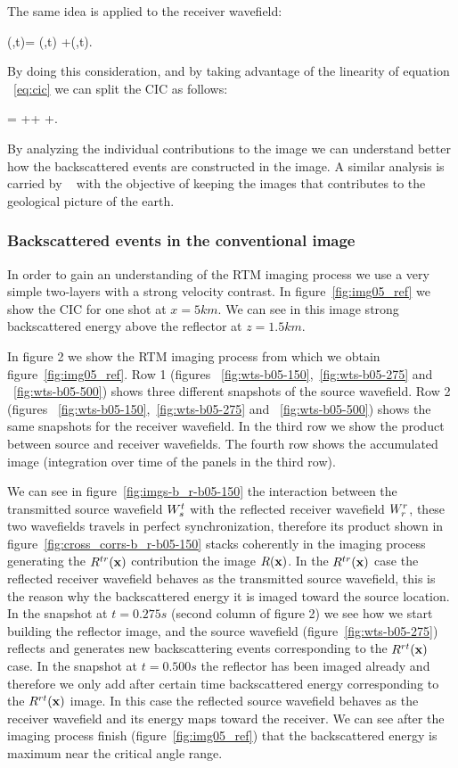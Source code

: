 The same idea is applied to the receiver wavefield:

\beq
\UR(\xx,t)= \URr(\xx,t) +\URt(\xx,t).
\label{eq:rsplit}
\eeq

By doing this consideration, and by taking advantage of the linearity of equation ~\ref{eq:cic}  we
can split the CIC as follows:

\beq
\R= ++  +.
\label{eq:cicsplit}
\eeq

By analyzing the individual contributions to the image we can understand better how the backscattered events
are constructed in the image. A similar analysis is carried by ~\citep{fei:3130,liu:S29} with the objective
of keeping the images that contributes to the geological picture of the earth.

\subsubsection{Backscattered events in the conventional image}

In order to gain an understanding of the RTM imaging process we use a very simple two-layers with a strong velocity
contrast. In figure~\ref{fig:img05_ref} we show the CIC for one shot at $x=5km$. We can see in this image strong 
backscattered energy above the reflector at $z=1.5km$.

In figure 2 we show the RTM imaging process from which we obtain figure~\ref{fig:img05_ref}. Row 1 
(figures ~\ref{fig:wts-b05-150},~\ref{fig:wts-b05-275} and ~\ref{fig:wts-b05-500}) shows three different snapshots
of the source wavefield. Row 2 (figures ~\ref{fig:wts-b05-150},~\ref{fig:wts-b05-275} and ~\ref{fig:wts-b05-500}) 
shows the same snapshots for the receiver wavefield. In the third row we show the product between
source and receiver wavefields. The fourth row shows the accumulated image (integration over time of the panels
in the third row).

We can see in figure~\ref{fig:imgs-b_r-b05-150} the interaction between the transmitted source wavefield ${W_s^t}$ with 
the reflected receiver wavefield ${W_r^r}$, these two wavefields travels in perfect synchronization, therefore its product 
shown in figure~\ref{fig:cross_corrs-b_r-b05-150} stacks coherently in the imaging process generating the $R^{tr}({\bf x})$ 
contribution the image $R({\bf x})$. In the $R^{tr}({\bf x})$ case the reflected receiver wavefield behaves as the transmitted
 source wavefield, this is the reason why the backscattered energy it is imaged toward the source location. 
In the snapshot at $t=0.275s$ (second column of figure 2) we see how we start building the reflector image,
 and the source wavefield (figure~\ref{fig:wts-b05-275}) reflects and generates new backscattering events
 corresponding to the  $R^{rt}({\bf x})$ case. In the snapshot at $t=0.500s$ the reflector has been imaged already and 
therefore we only add after certain time backscattered energy corresponding to the $R^{rt}({\bf x})$ image. In this case the 
reflected source wavefield behaves as the receiver wavefield and its energy maps toward the receiver. We can see after
 the imaging process finish (figure~\ref{fig:img05_ref}) that the backscattered energy is maximum near the critical
 angle range.

